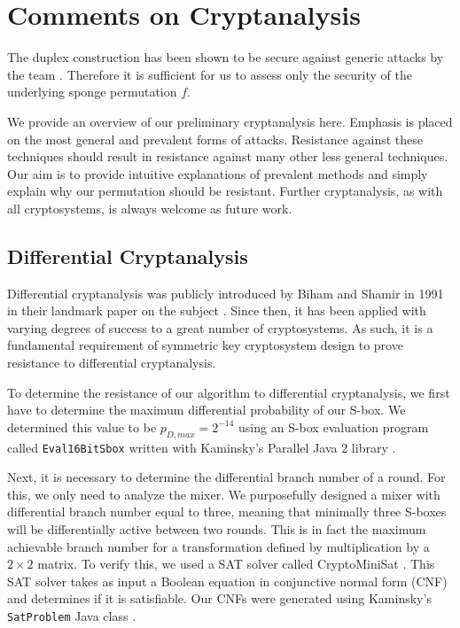 \section{Comments on Cryptanalysis}
\label{sec:Cryptanalysis}
The duplex construction has been shown to be secure against generic attacks by the \Keccak team \cite{Bertoni2011_SpongeFunctions}.
Therefore it is sufficient for us to assess only the security of the underlying sponge permutation $f$.

We provide an overview of our preliminary cryptanalysis here.
Emphasis is placed on the most general and prevalent forms of attacks.
Resistance against these techniques should result in resistance against many other less general techniques.
Our aim is to provide intuitive explanations of prevalent methods and simply explain why our permutation should be resistant.
Further cryptanalysis, as with all cryptosystems, is always welcome as future work.

\subsection{Differential Cryptanalysis}
Differential cryptanalysis was publicly introduced by Biham and Shamir in 1991 in their landmark paper on the subject \cite{Biham1991_Differential}.
Since then, it has been applied with varying degrees of success to a great number of cryptosystems.
As such, it is a fundamental requirement of symmetric key cryptosystem design to prove resistance to differential cryptanalysis.

To determine the resistance of our algorithm to differential cryptanalysis, we first have to determine the maximum differential probability of our S-box.
We determined this value to be $p_{D,max} = 2^{-14}$ using an S-box evaluation program called \texttt{Eval16BitSbox} \cite{Kaminsky2014_BlockCipherAnalysis} written with Kaminsky's Parallel Java 2 library \cite{Kaminsky2014_PJ2}.

Next, it is necessary to determine the differential branch number of a round.
For this, we only need to analyze the mixer. 
We purposefully designed a mixer with differential branch number equal to three, meaning that minimally three S-boxes will be differentially active between two rounds.
This is in fact the maximum achievable branch number for a transformation defined by multiplication by a $2 \times 2$ matrix.
To verify this, we used a SAT solver called CryptoMiniSat \cite{Soos2014_CryptoMiniSat}.
This SAT solver takes as input a Boolean equation in conjunctive normal form (CNF) and determines if it is satisfiable.
Our CNFs were generated using Kaminsky's \texttt{SatProblem} Java class \cite{Kaminsky2014_BlockCipherAnalysis}.

